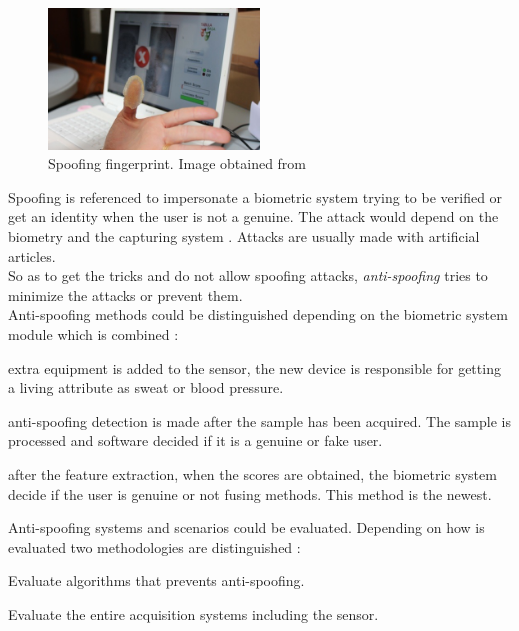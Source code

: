 \begin{figure}[htb]
\centering
\includegraphics[width=0.5\textwidth]{images_miscelaneus/spoofing_fingerprint.jpg}
\caption{Spoofing fingerprint. Image obtained from \cite{fingerprint_image}} \label{fig:Spoof_fingerprint}
\end{figure}

Spoofing is referenced to impersonate a biometric system trying to be verified or get an identity when the user is not a genuine. The attack would depend on the biometry and the capturing system \cite{Spoofing_survey}. Attacks are usually made with artificial articles.\\

So as to get the tricks and do not allow spoofing attacks, \textit{anti-spoofing} tries to minimize the attacks or prevent them.\\

Anti-spoofing methods could be distinguished depending on the biometric system module which is combined \cite{Spoofing_survey}:
\begin{description}[itemsep=2pt,topsep=8pt,parsep=0pt,partopsep=20pt]
\item[Sensor level:] extra equipment is added to the sensor, the new device is responsible for getting a living attribute as sweat or blood pressure.
\item[Feature level:] anti-spoofing detection is made after the sample has been acquired. The sample is processed and software decided if it is a genuine or fake user.
\item[Score level:] after the feature extraction, when the scores are obtained, the biometric system decide if the user is genuine or not fusing methods. This method is the newest.
\end{description}

Anti-spoofing systems and scenarios could be evaluated. Depending on how is evaluated two methodologies are distinguished \cite{Spoofing_survey}:
\begin{description}[itemsep=2pt,topsep=8pt,parsep=0pt,partopsep=20pt]
\item[Algorithm-based or technology evaluation:] Evaluate algorithms that prevents anti-spoofing.
\item[System-based or scenario evaluation:] Evaluate the entire acquisition systems including the sensor.
\end{description}

